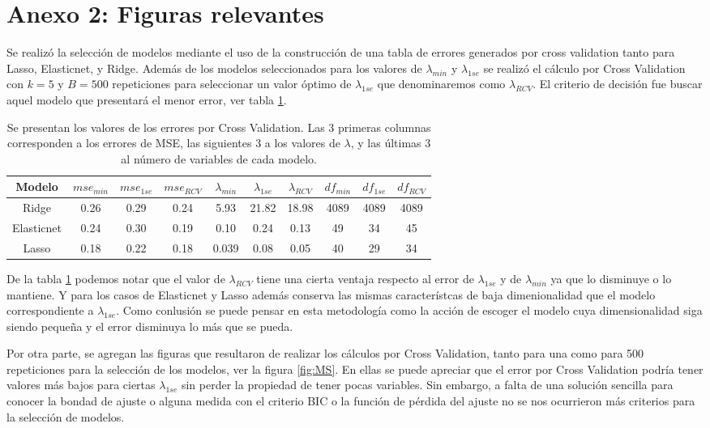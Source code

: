 \documentclass[11pt]{article}
\begin{document}
\section*{Anexo 2: Figuras relevantes}

Se realizó la selección de modelos mediante el uso de la construcción de una tabla de errores generados por cross validation tanto para Lasso, Elasticnet, y Ridge. Además de los modelos seleccionados para los valores de $\lambda_{min}$ y $\lambda_{1se}$ se realizó el cálculo por Cross Validation con $k=5$ y $B=500$ repeticiones para seleccionar un valor óptimo de $\lambda_{1se}$ que denominaremos como $\lambda_{RCV}$. El criterio de decisión fue buscar aquel modelo que presentará el menor error, ver tabla \ref{tabla:MS}.


\begin{table}[htbp]
\begin{center}
\begin{tabular}{|c|c|c|c|c|c|c|c|c|c|}
\hline
Modelo     &   $mse_{min}$ &  $mse_{1se}$ & $mse_{RCV}$ & $\lambda_{min}$ & $\lambda_{1se}$ & $\lambda_{RCV}$ & $df_{min}$ & $df_{1se}$ & $df_{RCV}$ \\
\hline \hline
Ridge      & 0.26 & 0.29 & 0.24 & 5.93 & 21.82 & 18.98 & 4089 & 4089 & 4089 \\ \hline
Elasticnet & 0.24 & 0.30 & 0.19 & 0.10 & 0.24 & 0.13 &  49  & 34 & 45 \\ \hline
Lasso      & 0.18 & 0.22 & 0.18 & 0.039 & 0.08 & 0.05 &  40  & 29 & 34 \\ \hline
\end{tabular}
\caption{Se presentan los valores de los errores por Cross Validation. Las $3$ primeras columnas corresponden a los errores de MSE, las siguientes $3$ a los valores de $\lambda$, y las últimas $3$ al número de variables de cada modelo.}
\label{tabla:MS}
\end{center}
\end{table}

De la tabla \ref{tabla:MS} podemos notar que el valor de $\lambda_{RCV}$ tiene una cierta ventaja respecto al error de $\lambda_{1se}$ y de $\lambda_{min}$ ya que lo disminuye o lo mantiene. Y para los casos de Elasticnet y Lasso además conserva las mismas característcas de baja dimenionalidad que el modelo correspondiente a $\lambda_{1se}$. Como conlusión se puede pensar en esta metodología como la acción de escoger el modelo cuya dimensionalidad siga siendo pequeña y el error disminuya lo más que se pueda.

Por otra parte, se agregan las figuras que resultaron de realizar los cálculos por Cross Validation, tanto para una como para 500 repeticiones para la selección de los modelos, ver la figura \ref{fig:MS}. En ellas se puede apreciar que el error por Cross Validation podría tener valores más bajos para ciertas $\lambda_{1se}$ sin perder la propiedad de tener pocas variables. Sin embargo, a falta de una solución sencilla para conocer la bondad de ajuste o alguna medida con el criterio BIC o la función de pérdida del ajuste no se nos ocurrieron más criterios para la selección de modelos. \\
\end{document}
